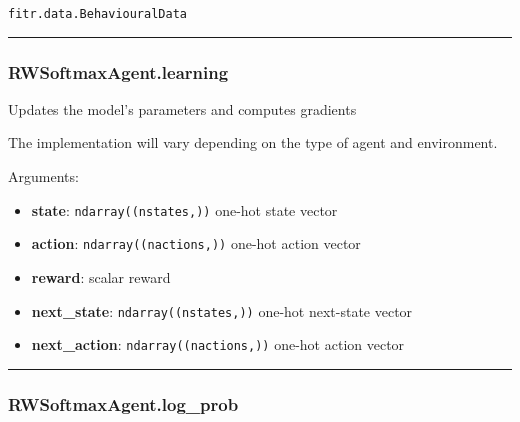 \texttt{fitr.data.BehaviouralData}

\begin{center}\rule{0.5\linewidth}{\linethickness}\end{center}

\subsubsection{RWSoftmaxAgent.learning}\label{rwsoftmaxagent.learning}

\begin{Shaded}
\begin{Highlighting}[]
\end{Highlighting}
\end{Shaded}

Updates the model's parameters and computes gradients

The implementation will vary depending on the type of agent and
environment.

Arguments:

\begin{itemize}
\tightlist
\item
  \textbf{state}: \texttt{ndarray((nstates,))} one-hot state vector
\item
  \textbf{action}: \texttt{ndarray((nactions,))} one-hot action vector
\item
  \textbf{reward}: scalar reward
\item
  \textbf{next\_state}: \texttt{ndarray((nstates,))} one-hot next-state
  vector
\item
  \textbf{next\_action}: \texttt{ndarray((nactions,))} one-hot action
  vector
\end{itemize}

\begin{center}\rule{0.5\linewidth}{\linethickness}\end{center}

\subsubsection{RWSoftmaxAgent.log\_prob}\label{rwsoftmaxagent.log_prob}

\begin{Shaded}
\begin{Highlighting}[]
\end{Highlighting}
\end{Shaded}

